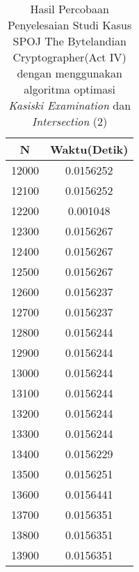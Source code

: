 \begin{table}[H]
\centering
\caption {Hasil Percobaan Penyelesaian Studi Kasus SPOJ The Bytelandian Cryptographer(Act IV) dengan menggunakan algoritma optimasi \textit{Kasiski Examination} dan \textit{Intersection} (2)}
\begin{tabular}{|c|c|}\hline
N&Waktu(Detik)\\ \hline
12000&0.0156252\\ \hline
12100&0.0156252\\ \hline
12200&0.001048\\ \hline
12300&0.0156267\\ \hline
12400&0.0156267\\ \hline
12500&0.0156267\\ \hline
12600&0.0156237\\ \hline
12700&0.0156237\\ \hline
12800&0.0156244\\ \hline
12900&0.0156244\\ \hline
13000&0.0156244\\ \hline
13100&0.0156244\\ \hline
13200&0.0156244\\ \hline
13300&0.0156244\\ \hline
13400&0.0156229\\ \hline
13500&0.0156251\\ \hline
13600&0.0156441\\ \hline
13700&0.0156351\\ \hline
13800&0.0156351\\ \hline
13900&0.0156351\\ \hline
\end{tabular}
\label{tab:1res5}
\end{table}
